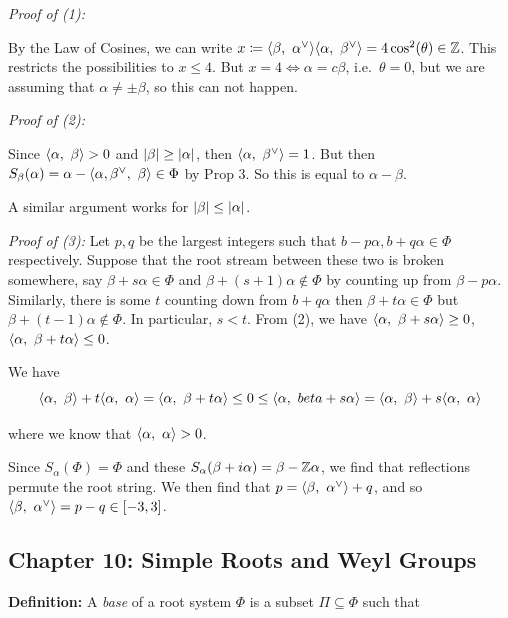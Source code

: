 \emph{Proof of (1):}

By the Law of Cosines, we can write
\(x \coloneqq {\left\langle {\beta},~{\alpha^\vee} \right\rangle} {\left\langle {\alpha},~{\beta^\vee} \right\rangle} = 4\cos^2(\theta) \in {\mathbb{Z}}\).
This restricts the possibilities to \(x \leq 4\). But
\(x = 4 \iff \alpha = c \beta\), i.e.~\(\theta = 0\), but we are
assuming that \(\alpha \neq \pm \beta\), so this can not happen.

\emph{Proof of (2):}

Since \({\left\langle {\alpha},~{\beta} \right\rangle} > 0\) and \({\left\lvert {\beta} \right\rvert} \geq {\left\lvert {\alpha} \right\rvert}\),
then \({\left\langle {\alpha},~{\beta^\vee} \right\rangle} = 1\). But then
\(S_\beta(\alpha) = \alpha - {\left\langle {\alpha, \beta^\vee},~{\beta} \right\rangle} \in\Phi\)
by Prop 3. So this is equal to \(\alpha - \beta\).

A similar argument works for \({\left\lvert {\beta} \right\rvert} \leq {\left\lvert {\alpha} \right\rvert}\).

\emph{Proof of (3):} Let \(p,q\) be the largest integers such that
\(b-p\alpha, b+q\alpha \in \Phi\) respectively. Suppose that the root
stream between these two is broken somewhere, say
\(\beta + s\alpha \in \Phi\) and \(\beta + (s+1)\alpha \not\in\Phi\) by
counting up from \(\beta - p\alpha\). Similarly, there is some \(t\)
counting down from \(b+q\alpha\) then \(\beta + t\alpha \in \Phi\) but
\(\beta + (t-1)\alpha \not\in\Phi\). In particular, \(s < t\). From (2),
we have \({\left\langle {\alpha},~{\beta + s\alpha} \right\rangle} \geq 0\),
\({\left\langle {\alpha},~{\beta + t\alpha} \right\rangle} \leq 0\).

We have \[
{\left\langle {\alpha},~{\beta} \right\rangle} + t{\left\langle {\alpha},~{\alpha} \right\rangle} = {\left\langle {\alpha},~{\beta + t\alpha} \right\rangle} \leq 0 \leq {\left\langle {\alpha},~{beta + s\alpha} \right\rangle} = {\left\langle {\alpha},~{\beta} \right\rangle} + s{\left\langle {\alpha},~{\alpha} \right\rangle}
\]

where we know that \({\left\langle {\alpha},~{\alpha} \right\rangle} > 0\).

Since \(S_\alpha(\Phi) = \Phi\) and these
\(S_\alpha(\beta + i\alpha) = \beta - {\mathbb{Z}} \alpha\), we find that
reflections permute the root string. We then find that
\(p = {\left\langle {\beta},~{\alpha^\vee} \right\rangle} + q\), and so
\({\left\langle {\beta},~{\alpha^\vee} \right\rangle} = p-q \in [-3, 3]\).

\hypertarget{chapter-10-simple-roots-and-weyl-groups}{%
\subsection{Chapter 10: Simple Roots and Weyl
Groups}\label{chapter-10-simple-roots-and-weyl-groups}}

\textbf{Definition:} A \emph{base} of a root system \(\Phi\) is a subset
\(\Pi \subseteq \Phi\) such that

